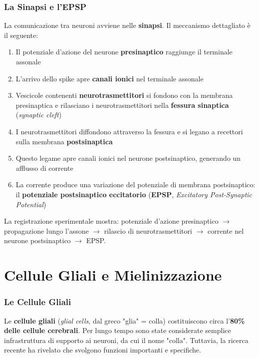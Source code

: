 \subsubsection{La Sinapsi e l'EPSP}

La comunicazione tra neuroni avviene nelle \textbf{sinapsi}. Il meccanismo dettagliato è il seguente:

\begin{enumerate}
    \item Il potenziale d'azione del neurone \textbf{presinaptico} raggiunge il terminale assonale
    \item L'arrivo dello spike apre \textbf{canali ionici} nel terminale assonale
    \item Vescicole contenenti \textbf{neurotrasmettitori} si fondono con la membrana presinaptica e rilasciano i neurotrasmettitori nella \textbf{fessura sinaptica} (\textit{synaptic cleft})
    \item I neurotrasmettitori diffondono attraverso la fessura e si legano a recettori sulla membrana \textbf{postsinaptica}
    \item Questo legame apre canali ionici nel neurone postsinaptico, generando un afflusso di corrente
    \item La corrente produce una variazione del potenziale di membrana postsinaptico: il \textbf{potenziale postsinaptico eccitatorio} (\textbf{EPSP}, \textit{Excitatory Post-Synaptic Potential})
\end{enumerate}

La registrazione sperimentale mostra: potenziale d'azione presinaptico $\rightarrow$ propagazione lungo l'assone $\rightarrow$ rilascio di neurotrasmettitori $\rightarrow$ corrente nel neurone postsinaptico $\rightarrow$ EPSP.



\section{Cellule Gliali e Mielinizzazione}

\subsubsection{Le Cellule Gliali}

Le \textbf{cellule gliali} (\textit{glial cells}, dal greco "glia" = colla) costituiscono circa l'\textbf{80\% delle cellule cerebrali}. Per lungo tempo sono state considerate semplice infrastruttura di supporto ai neuroni, da cui il nome "colla". Tuttavia, la ricerca recente ha rivelato che svolgono funzioni importanti e specifiche.

